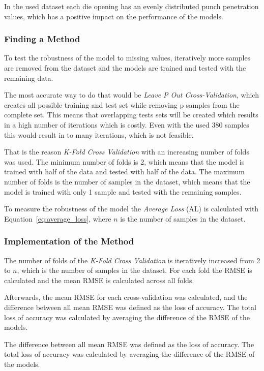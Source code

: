 In the used dataset each die opening has an evenly distributed punch penetration values, which
has a positive impact on the performance of the models.

\subsubsection*{Finding a Method}
To test the robustness of the model to missing values, iteratively more samples are removed from
the dataset and the models are trained and tested with the remaining data.

The most accurate way to do that would be \textit{Leave P Out Cross-Validation}, which creates
all possible training and test set while removing p samples from the complete set. This means
that overlapping tests sets will be created which results in a high number of iterations which is
costly.
Even with the used 380 samples this would result in to many iterations, which is not feasible.

That is the reason \textit{K-Fold Cross Validation} with an increasing number of folds was used.
The minimum number of folds is 2, which means that the model is trained with half of the data and
tested with half of the data.
The maximum number of folds is the number of samples in the dataset, which means that the model
is trained with only 1 sample and tested with the remaining samples.

To measure the robustness of the model the \textit{Average Loss} (AL) is calculated with
Equation~\ref{eq:average_loss}, where $n$ is the number of samples in the dataset.

\subsubsection*{Implementation of the Method}
The number of folds of the \textit{K-Fold Cross Validation} is iteratively increased from 2 to
$n$, which is the number of samples in the dataset.
For each fold the \ac{RMSE} is calculated and the mean \ac{RMSE} is calculated across all folds.

Afterwards, the mean \ac{RMSE} for each cross-validation was calculated, and the difference
between all mean \ac{RMSE} was defined as the loss of accuracy. The total loss of accuracy was
calculated by averaging the difference of the \ac{RMSE} of the models.

The difference between all mean \ac{RMSE} was defined as the loss of accuracy. The total loss of
accuracy was calculated by averaging the difference of the \ac{RMSE} of the models.


